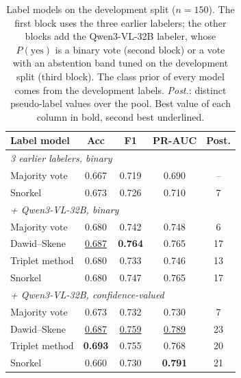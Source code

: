\begin{table}[t]
\centering
\footnotesize
\setlength{\tabcolsep}{3pt}
\caption{Label models on the development split ($n=150$). The first block uses the three earlier labelers; the other blocks add the Qwen3-VL-32B labeler, whose $P(\mathrm{yes})$ is a binary vote (second block) or a vote with an abstention band tuned on the development split (third block). The class prior of every model comes from the development labels. \emph{Post.}: distinct pseudo-label values over the pool. Best value of each column in bold, second best underlined.}
\label{tab:labelmodels}
\begin{tabular}{lcccc}
\toprule
Label model & Acc & F1 & PR-AUC & Post. \\
\midrule
\multicolumn{5}{l}{\emph{3 earlier labelers, binary}} \\
Majority vote & 0.667 & 0.719 & 0.690 & --  \\
Snorkel & 0.673 & 0.726 & 0.710 & 7  \\
\multicolumn{5}{l}{\emph{+ Qwen3-VL-32B, binary}} \\
Majority vote & 0.680 & 0.742 & 0.748 & 6  \\
Dawid--Skene & \underline{0.687} & \textbf{0.764} & 0.765 & 17  \\
Triplet method & 0.680 & 0.733 & 0.746 & 13  \\
Snorkel & 0.680 & 0.747 & 0.765 & 17  \\
\multicolumn{5}{l}{\emph{+ Qwen3-VL-32B, confidence-valued}} \\
Majority vote & 0.673 & 0.732 & 0.730 & 7  \\
Dawid--Skene & \underline{0.687} & \underline{0.759} & \underline{0.789} & 23  \\
Triplet method & \textbf{0.693} & 0.755 & 0.768 & 20  \\
Snorkel & 0.660 & 0.730 & \textbf{0.791} & 21  \\
\bottomrule
\end{tabular}
\end{table}

